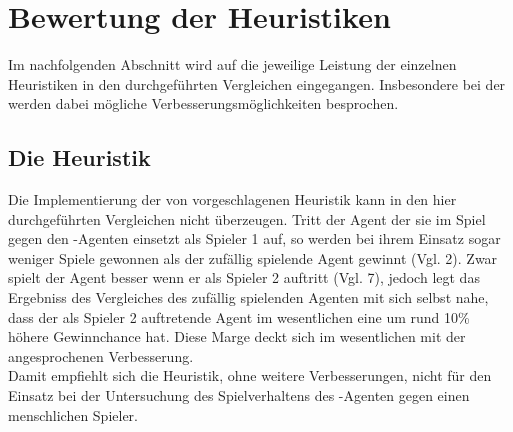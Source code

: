 \section{Bewertung der Heuristiken}
\label{sect:Fazit:Heuristiken}
Im nachfolgenden Abschnitt wird auf die jeweilige Leistung der einzelnen Heuristiken in den durchgeführten Vergleichen eingegangen. Insbesondere bei der  werden dabei mögliche Verbesserungsmöglichkeiten besprochen.  
\subsection{Die Heuristik }
Die Implementierung der von \cite{nijssen_2007} vorgeschlagenen Heuristik kann in den hier durchgeführten Vergleichen nicht überzeugen. Tritt der Agent der sie im Spiel gegen den -Agenten einsetzt als Spieler 1 auf, so werden bei ihrem Einsatz sogar weniger Spiele gewonnen als der zufällig spielende Agent gewinnt (Vgl. 2). Zwar spielt der Agent besser wenn er als Spieler 2 auftritt (Vgl. 7), jedoch legt das Ergebniss des Vergleiches des zufällig spielenden Agenten mit sich selbst nahe, dass der als Spieler 2 auftretende Agent im wesentlichen eine um rund 10\% höhere Gewinnchance hat. Diese Marge deckt sich im wesentlichen mit der angesprochenen Verbesserung.
\\Damit empfiehlt sich die Heuristik, ohne weitere Verbesserungen, nicht für den Einsatz bei der Untersuchung des Spielverhaltens des -Agenten gegen einen menschlichen Spieler. 
